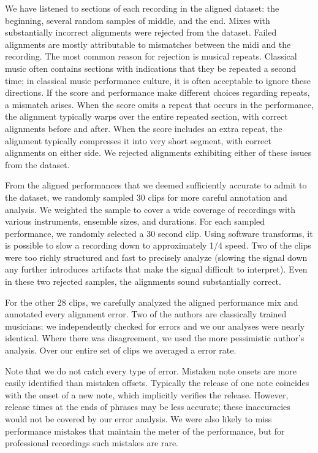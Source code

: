 \documentclass{article} \usepackage{iclr2017_conference,times}
\begin{document}
We have listened to sections of each recording in the aligned dataset: the beginning, several random samples of middle, and the end. Mixes with substantially incorrect alignments were rejected from the dataset. Failed alignments are mostly attributable to mismatches between the midi and the recording. The most common reason for rejection is musical repeats. Classical music often contains sections with indications that they be repeated a second time; in classical music performance culture, it is often acceptable to ignore these directions. If the score and performance make different choices regarding repeats, a mismatch arises. When the score omits a repeat that occurs in the performance, the alignment typically warps over the entire repeated section, with correct alignments before and after. When the score includes an extra repeat, the alignment typically compresses it into very short segment, with correct alignments on either side. We rejected alignments exhibiting either of these issues from the dataset.

From the aligned performances that we deemed sufficiently accurate to admit to the dataset, we randomly sampled 30 clips for more careful annotation and analysis. We weighted the sample to cover a wide coverage of recordings with various instruments, ensemble sizes, and durations. For each sampled performance, we randomly selected a 30 second clip. Using software transforms, it is possible to slow a recording down to approximately 1/4 speed. Two of the clips were too richly structured and fast to precisely analyze (slowing the signal down any further introduces artifacts that make the signal difficult to interpret). Even in these two rejected samples, the alignments sound substantially correct. 

For the other 28 clips, we carefully analyzed the aligned performance mix and annotated every alignment error. Two of the authors are classically trained musicians: we independently checked for errors and we our analyses were nearly identical. Where there was disagreement, we used the more pessimistic author's analysis. Over our entire set of clips we averaged a  error rate. 

Note that we do not catch every type of error. Mistaken note onsets are more easily identified than mistaken offsets. Typically the release of one note coincides with the onset of a new note, which implicitly verifies the release. However, release times at the ends of phrases may be less accurate; these inaccuracies would not be covered by our error analysis. We were also likely to miss performance mistakes that maintain the meter of the performance, but for professional recordings such mistakes are rare. 
\end{document}
